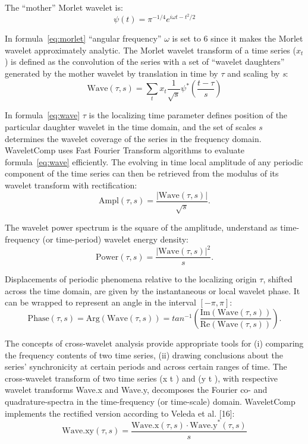 \documentclass{biophys-new}
\begin{document}
The “mother” Morlet wavelet is:
\begin{equation}\label{eq:morlet}
\psi(t)=\pi^{-1/4}e^{i\omega t-{t^2}/2}
\end{equation}


In formula~\ref{eq:morlet} “angular frequency” $\omega$ is set to 6 since it makes the Morlet wavelet approximately analytic.
The Morlet wavelet transform of a time series (${x}_{t}$) is defined as the convolution of the series with a set of “wavelet daughters” generated by the mother wavelet by translation in time by $\tau$ and scaling by \textit{s}:
\begin{equation}\label{eq:wave}
\text{Wave}(\tau, s)=\sum_{t}x_{t}\frac{1}{\sqrt{s}}\psi^{\ast}\left(\frac{t-\tau}{s}\right)
\end{equation}

In formula~\ref{eq:wave} $\tau$ is the localizing time parameter defines position of the particular daughter wavelet in the time domain, and the set of scales $s$ determines the wavelet coverage of the series in the frequency domain.
WaveletComp uses Fast Fourier Transform algorithms to evaluate formula~\ref{eq:wave} efficiently.
The evolving in time local amplitude of any periodic component of the time series can then be retrieved from the modulus of its wavelet transform with rectification:
\begin{equation}\label{eq:amplitude}
\text{Ampl}(\tau, s)=\frac{|\text{Wave}(\tau, s)|}{\sqrt{s}}.
\end{equation}

The wavelet power spectrum is the square of the amplitude, understand as time-frequency (or time-period) wavelet energy density:
\begin{equation}\label{eq:power}
\text{Power}(\tau, s)=\frac{|\text{Wave}(\tau, s)|^2}{s}.
\end{equation}

Displacements of periodic phenomena relative to the localizing origin $\tau$, shifted across the time domain, are given by the instantaneous or local wavelet phase.
It can be wrapped to represent an angle in the interval $[-\pi,\pi]$:
\begin{equation}\label{eq:phase}
\text{Phase}(\tau, s)=\text{Arg}(\text{Wave}(\tau, s))=tan^{-1}\left(\frac{\text{Im}(\text{Wave}(\tau, s))}{\text{Re}(\text{Wave}(\tau, s))}\right).
\end{equation}

The concepts of cross-wavelet analysis provide appropriate tools for (i) comparing the frequency contents of two time series, (ii) drawing conclusions about the series’ synchronicity at certain periods and across certain ranges of time.
The cross-wavelet transform of two time series (x t ) and (y t ), with respective wavelet transforms Wave.x and Wave.y, decomposes the Fourier co- and quadrature-spectra in the time-frequency (or time-scale) domain.
WaveletComp implements the rectified version according to Veleda et al. [16]:
\begin{equation}\label{eq:wave.xy}
\text{Wave.xy}(\tau, s)=\frac{\text{Wave.x}(\tau, s)\cdot\text{Wave.y}^{\ast}(\tau, s)}{s}
\end{equation}
\end{document}
